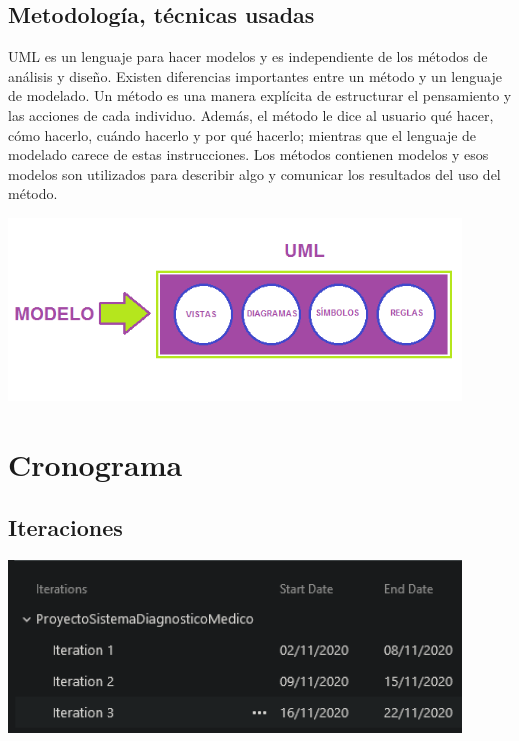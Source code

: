 \documentclass[preprint,12pt]{elsarticle}
\begin{document}
\subsection{\textbf{ Metodología, técnicas usadas  }}
UML es un lenguaje para hacer modelos y es independiente de los métodos de análisis y diseño. Existen diferencias importantes entre un método y un lenguaje de modelado. Un método es una manera explícita de estructurar el pensamiento y las acciones de cada individuo. Además, el método le dice al usuario qué hacer, cómo hacerlo, cuándo hacerlo y por qué hacerlo; mientras que el lenguaje de modelado carece de estas instrucciones. Los métodos contienen modelos y esos modelos son utilizados para describir algo y comunicar los resultados del uso del método.
          \begin{center}
	\includegraphics[width=12cm]{./imagen/5} 
	\end{center}
		
\section{Cronograma }
	
	\subsection{Iteraciones}
	\begin{center}
		\includegraphics[width=12cm]{./imagen/Screenshot_3.png} 
	\end{center}
	
\end{document}
